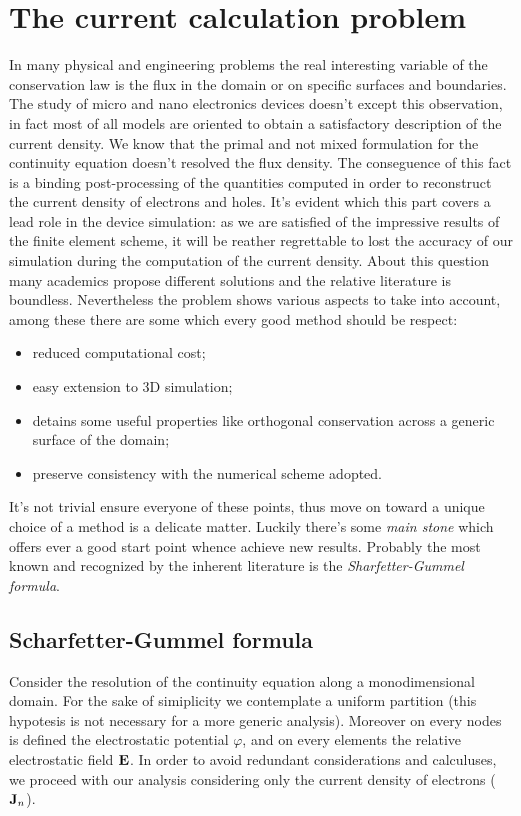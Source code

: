 \section{The current calculation problem}

In many physical and engineering problems the real interesting variable of the conservation law is the flux in the domain or on specific surfaces and boundaries. The study of micro and nano electronics devices doesn't except this observation, in fact most of all models are oriented to obtain a satisfactory description of the current density.
 We know that the primal and not mixed formulation for  the continuity equation doesn't resolved  the flux density. The conseguence of this fact is a binding post-processing of the quantities computed in order to reconstruct the current density of electrons and holes.
It's evident which this part covers a lead role in the device simulation: 
as we are satisfied of the impressive results of the finite element scheme, it will be reather regrettable to lost the accuracy of our simulation during the computation of the current density.
About this question many academics propose different solutions and  the relative literature is boundless.
 Nevertheless the problem shows various aspects to take into account, among these there are some which every good method should be respect:	
 \begin{itemize}
 \item reduced computational cost;
 \item easy extension to 3D simulation;
 \item detains some useful properties like orthogonal conservation across a generic surface of the domain;
 \item preserve consistency with the numerical scheme adopted.
 \end{itemize}
 It's not trivial ensure everyone of these points, thus move on toward a unique choice of a method is a delicate matter. Luckily there's some \textit{main stone} which offers ever a good start point whence achieve new results. Probably the most known and recognized by the inherent literature is the \textit{Sharfetter-Gummel formula}.

\subsection{Scharfetter-Gummel formula}

Consider the resolution of the continuity equation along a monodimensional domain. For the sake of simiplicity we contemplate a uniform partition (this hypotesis is not necessary for a more generic analysis). Moreover on every nodes is defined the electrostatic potential $\varphi$, and on every elements the relative electrostatic field $\mathbf{E}$. In order to avoid redundant considerations and calculuses, we proceed with our analysis considering only the current density of electrons ($\mathbf{J}_n$).

